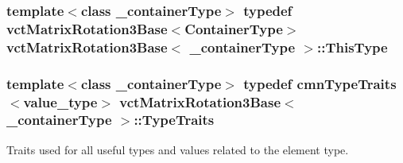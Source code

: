 \hypertarget{classvct_matrix_rotation3_base_a027be766cb10ca3c2ad8e85c28ed0af9}{
\subsubsection[{This\-Type}]{\setlength{\rightskip}{0pt plus 5cm}template$<$class \-\_\-container\-Type$>$ typedef {\bf vct\-Matrix\-Rotation3\-Base}$<${\bf Container\-Type}$>$ {\bf vct\-Matrix\-Rotation3\-Base}$<$ \-\_\-container\-Type $>$\-::{\bf This\-Type}}}\label{classvct_matrix_rotation3_base_a027be766cb10ca3c2ad8e85c28ed0af9}
\hypertarget{classvct_matrix_rotation3_base_aa759c028d73ab710d2e116ca08252719}{
\subsubsection[{Type\-Traits}]{\setlength{\rightskip}{0pt plus 5cm}template$<$class \-\_\-container\-Type$>$ typedef {\bf cmn\-Type\-Traits}$<$value\-\_\-type$>$ {\bf vct\-Matrix\-Rotation3\-Base}$<$ \-\_\-container\-Type $>$\-::{\bf Type\-Traits}}}\label{classvct_matrix_rotation3_base_aa759c028d73ab710d2e116ca08252719}
Traits used for all useful types and values related to the element type. 

